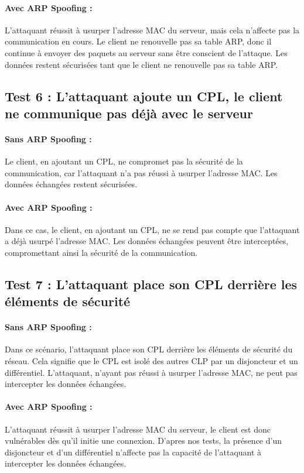 \documentclass[a4paper,twocolumn]{report}
\begin{document}
\paragraph{Avec ARP Spoofing :}
L'attaquant réussit à usurper l'adresse MAC du serveur,
mais cela n'affecte pas la communication en cours.
Le client ne renouvelle pas sa table ARP, donc il continue à envoyer des paquets
au serveur sans être conscient de l'attaque. Les données restent sécurisées tant
que le client ne renouvelle pas sa table ARP.

\subsection{Test 6 : L'attaquant ajoute un CPL, le client ne communique pas déjà avec le serveur}
\paragraph{Sans ARP Spoofing :}
Le client, en ajoutant un CPL, ne compromet pas la sécurité de la communication,
car l'attaquant n'a pas réussi à usurper l'adresse MAC. Les données échangées restent sécurisées.

\paragraph{Avec ARP Spoofing :}
Dans ce cas, le client, en ajoutant un CPL, ne se rend pas compte que l'attaquant a déjà usurpé l'adresse MAC.
Les données échangées peuvent être interceptées, compromettant ainsi la sécurité de la communication.

\subsection{Test 7 : L'attaquant place son CPL derrière les éléments de sécurité}
\paragraph{Sans ARP Spoofing :}
Dans ce scénario, l'attaquant place son CPL derrière les éléments de sécurité du réseau. Cela signifie que le CPL est isolé des autres CLP par un disjoncteur et un différentiel.
L'attaquant, n'ayant pas réussi à usurper l'adresse MAC, ne peut pas intercepter les données échangées.
\paragraph{Avec ARP Spoofing :}
L'attaquant réussit à usurper l'adresse MAC du serveur, le client est donc vulnérables dès qu'il initie une connexion.
D'apres nos tests, la présence d'un disjoncteur et d'un différentiel n'affecte pas la capacité de l'attaquant à intercepter les données échangées.
\end{document}
